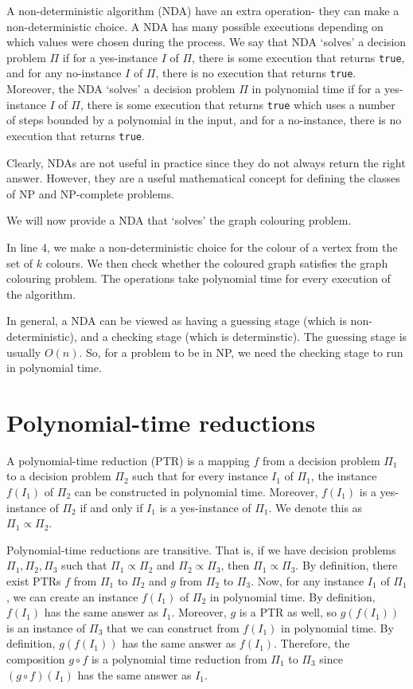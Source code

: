 \documentclass[a4paper, openany]{memoir}
\begin{document}
A non-deterministic algorithm (NDA) have an extra operation- they can make a non-deterministic choice. A NDA has many possible executions depending on which values were chosen during the process. We say that NDA `solves' a decision problem $\Pi$ if for a yes-instance $I$ of $\Pi$, there is some execution that returns \texttt{true}, and for any no-instance $I$ of $\Pi$, there is no execution that returns \texttt{true}. Moreover, the NDA `solves' a decision problem $\Pi$ in polynomial time if for a yes-instance $I$ of $\Pi$, there is some execution that returns \texttt{true} which uses a number of steps bounded by a polynomial in the input, and for a no-instance, there is no execution that returns \texttt{true}.

Clearly, NDAs are not useful in practice since they do not always return the right answer. However, they are a useful mathematical concept for defining the classes of NP and NP-complete problems.

We will now provide a NDA that `solves' the graph colouring problem.

In line 4, we make a non-deterministic choice for the colour of a vertex from the set of $k$ colours. We then check whether the coloured graph satisfies the graph colouring problem. The operations take polynomial time for every execution of the algorithm.

In general, a NDA can be viewed as having a guessing stage (which is non-deterministic), and a checking stage (which is determinstic). The guessing stage is usually $O(n)$. So, for a problem to be in NP, we need the checking stage to run in polynomial time.
\newpage

\section{Polynomial-time reductions}
A polynomial-time reduction (PTR) is a mapping $f$ from a decision problem $\Pi_1$ to a decision problem $\Pi_2$ such that for every instance $I_1$ of $\Pi_1$, the instance $f(I_1)$ of $\Pi_2$ can be constructed in polynomial time. Moreover, $f(I_1)$ is a yes-instance of $\Pi_2$ if and only if $I_1$ is a yes-instance of $\Pi_1$. We denote this as $\Pi_1 \varpropto \Pi_2$.

Polynomial-time reductions are transitive. That is, if we have decision problems $\Pi_1, \Pi_2, \Pi_3$ such that $\Pi_1 \varpropto \Pi_2$ and $\Pi_2 \varpropto \Pi_3$, then $\Pi_1 \varpropto \Pi_3$. By definition, there exist PTRs $f$ from $\Pi_1$ to $\Pi_2$ and $g$ from $\Pi_2$ to $\Pi_3$. Now, for any instance $I_1$ of $\Pi_1$, we can create an instance $f(I_1)$ of $\Pi_2$ in polynomial time. By definition, $f(I_1)$ has the same answer as $I_1$. Moreover, $g$ is a PTR as well, so $g(f(I_1))$ is an instance of $\Pi_3$ that we can construct from $f(I_1)$ in polynomial time. By definition, $g(f(I_1))$ has the same answer as $f(I_1)$. Therefore, the composition $g \circ f$ is a polynomial time reduction from $\Pi_1$ to $\Pi_3$ since $(g \circ f)(I_1)$ has the same answer as $I_1$.
\end{document}
